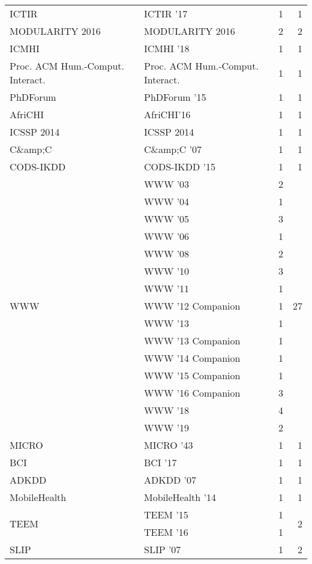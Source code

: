 \begin{table*}[t]
\begin{tabular}{llrr}
\multirow{1}{*}{ICTIR } & ICTIR '17 & 1 & \multirow{1}{*}{1}\\
\multirow{1}{*}{MODULARITY 2016} & MODULARITY 2016 & 2 & \multirow{1}{*}{2}\\
\multirow{1}{*}{ICMHI } & ICMHI '18 & 1 & \multirow{1}{*}{1}\\
\multirow{1}{*}{Proc. ACM Hum.-Comput. Interact.} & Proc. ACM Hum.-Comput. Interact. & 1 & \multirow{1}{*}{1}\\
\multirow{1}{*}{PhDForum } & PhDForum '15 & 1 & \multirow{1}{*}{1}\\
\multirow{1}{*}{AfriCHI} & AfriCHI'16 & 1 & \multirow{1}{*}{1}\\
\multirow{1}{*}{ICSSP 2014} & ICSSP 2014 & 1 & \multirow{1}{*}{1}\\
\multirow{1}{*}{C\&amp;C } & C\&amp;C '07 & 1 & \multirow{1}{*}{1}\\
\multirow{1}{*}{CODS-IKDD } & CODS-IKDD '15 & 1 & \multirow{1}{*}{1}\\
\multirow{15}{*}{WWW } & WWW '03 & 2 & \multirow{15}{*}{27}\\
& WWW '04 & 1 &\\
& WWW '05 & 3 &\\
& WWW '06 & 1 &\\
& WWW '08 & 2 &\\
& WWW '10 & 3 &\\
& WWW '11 & 1 &\\
& WWW '12 Companion & 1 &\\
& WWW '13 & 1 &\\
& WWW '13 Companion & 1 &\\
& WWW '14 Companion & 1 &\\
& WWW '15 Companion & 1 &\\
& WWW '16 Companion & 3 &\\
& WWW '18 & 4 &\\
& WWW '19 & 2 &\\
\multirow{1}{*}{MICRO } & MICRO '43 & 1 & \multirow{1}{*}{1}\\
\multirow{1}{*}{BCI } & BCI '17 & 1 & \multirow{1}{*}{1}\\
\multirow{1}{*}{ADKDD } & ADKDD '07 & 1 & \multirow{1}{*}{1}\\
\multirow{1}{*}{MobileHealth } & MobileHealth '14 & 1 & \multirow{1}{*}{1}\\
\multirow{2}{*}{TEEM } & TEEM '15 & 1 & \multirow{2}{*}{2}\\
& TEEM '16 & 1 &\\
\multirow{2}{*}{SLIP } & SLIP '07 & 1 & \multirow{2}{*}{2}\\

\end{tabular}
\end{table*}
